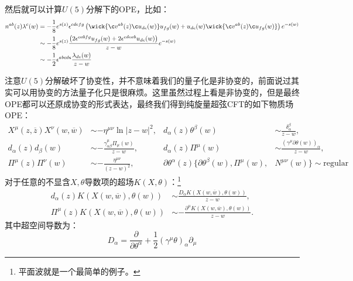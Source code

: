 然后就可以计算$U(5)$分解下的OPE，比如：
\begin{equation}
	\begin{aligned}
		n^{ab}(z)\lambda^c(w)&=-\frac{1}{8}e^{s(z)}\epsilon^{cdefg}\left(\wick{\c v^{ab}(z)\c u_{de}(w)}u_{fg}(w)+u_{de}(w)\wick{\c v^{ab}(z)\c u_{fg}(w)}\right)e^{-s(w)}\\&\sim-\frac{1}{8}e^{s(z)}\frac{\left(2\epsilon^{cabfg}u_{fg}(w)+2\epsilon^{cdeab}u_{de}(w)\right)}{z-w}e^{-s(w)}\\&\sim-\frac{1}{2}\epsilon^{abcde}\frac{\lambda_{de}(w)}{z-w}
	\end{aligned}
\end{equation}

注意$U(5)$分解破坏了协变性，并不意味着我们的量子化是非协变的，前面说过其实可以用协变的方法量子化只是很麻烦。这里虽然过程上看是非协变的，但是最终OPE都可以还原成协变的形式表达，最终我们得到纯旋量超弦CFT的如下物质场OPE：
\begin{equation}
	\begin{aligned}
		X^\mu(z,\overline{z}) X^\nu(w,\overline{w}) 
		&\sim -\eta^{\mu\nu} \ln|z-w|^2, 
		& d_\alpha(z) \theta^\beta(w) 
		&\sim \frac{\delta_\alpha^\beta}{z-w}, \\
		d_\alpha(z) d_\beta(w) 
		&\sim -\frac{\gamma_{\alpha\beta}^\mu \Pi_\mu(w)}{z-w}, 
		& d_\alpha(z) \Pi^\mu(w) 
		&\sim \frac{(\gamma^\mu \partial\theta(w))_\alpha}{z-w}, \\
		\Pi^\mu(z) \Pi^\nu(w) 
		&\sim -\frac{\eta^{\mu\nu}}{(z-w)^2},&
		\partial\theta^\alpha(z) \{ \partial\theta^\beta(w),\Pi^\mu(w),&N^{\mu\nu}(w) \} \sim \mathrm{regular}
	\end{aligned}
\end{equation}
对于任意的不显含$X,\theta$导数项的超场$K(X,\theta)$：\footnote{平面波就是一个最简单的例子。}
\begin{equation}
	\begin{aligned}
		d_\alpha(z) K\left(X(w,\overline{w}), \theta(w)\right) 
		&\sim \frac{D_\alpha K\left(X(w,\overline{w}), \theta(w)\right)}{z-w}, \\
		\Pi^\mu(z) K\left(X(w,\overline{w}), \theta(w)\right) 
		&\sim -\frac{\partial^\mu K\left(X(w,\overline{w}), \theta(w)\right)}{z-w}.
	\end{aligned}
\end{equation}
其中超空间导数为：
\begin{equation}
	D_\alpha=\frac{\partial}{\partial\theta^\alpha}+\frac{1}{2}(\gamma^\mu\theta)_\alpha\partial_\mu
\end{equation}
